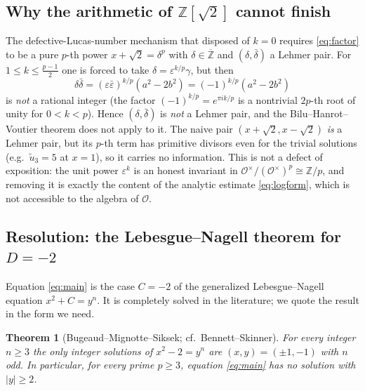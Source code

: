 \documentclass{amsart}
\newtheorem{theorem}{Theorem}
\theoremstyle{definition}
\begin{document}
\subsection*{Why the arithmetic of $\mathbb Z[\sqrt2]$ cannot finish}
The defective-Lucas-number mechanism that disposed of $k=0$ requires
\eqref{eq:factor} to be a pure $p$-th power $x+\sqrt2=\delta^p$ with
$\delta\in\overline{\mathbb Z}$ and $(\delta,\bar\delta)$ a Lehmer pair. For
$1\le k\le \frac{p-1}{2}$ one is forced to take $\delta=\varepsilon^{k/p}\gamma$,
but then
\[
\delta\bar\delta=(\varepsilon\bar\varepsilon)^{k/p}(a^2-2b^2)
=(-1)^{k/p}(a^2-2b^2)
\]
is \emph{not} a rational integer (the factor $(-1)^{k/p}=e^{\pi i k/p}$ is a
nontrivial $2p$-th root of unity for $0<k<p$). Hence $(\delta,\bar\delta)$ is
\emph{not} a Lehmer pair, and the Bilu--Hanrot--Voutier theorem does not apply
to it. The naive pair $(x+\sqrt2,x-\sqrt2)$ \emph{is} a Lehmer pair, but its
$p$-th term has primitive divisors even for the trivial solutions (e.g.\
$\tilde u_3=5$ at $x=1$), so it carries no information. This is not a defect of
exposition: the unit power $\varepsilon^k$ is an honest invariant in
$\mathcal O^\times/(\mathcal O^\times)^p\cong\mathbb Z/p$, and removing it is
exactly the content of the analytic estimate \eqref{eq:logform}, which is not
accessible to the algebra of $\mathcal O$.

\subsection*{Resolution: the Lebesgue--Nagell theorem for $D=-2$}
Equation \eqref{eq:main} is the case $C=-2$ of the generalized
Lebesgue--Nagell equation $x^2+C=y^n$. It is completely solved in the
literature; we quote the result in the form we need.

\begin{theorem}[Bugeaud--Mignotte--Siksek; cf.\ Bennett--Skinner]
\label{thm:bms}
For every integer $n\ge3$ the only integer solutions of $x^2-2=y^n$ are
$(x,y)=(\pm1,-1)$ with $n$ odd. In particular, for every prime $p\ge3$,
equation \eqref{eq:main} has no solution with $|y|\ge2$.
\end{theorem}
\end{document}
